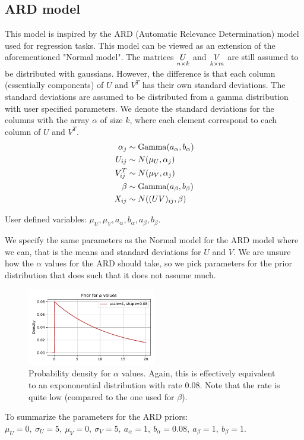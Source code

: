 \documentclass[12pt]{article}
\begin{document}
    \subsection{ARD model}
    This model is inspired by the ARD (Automatic Relevance Determination) model used for regression tasks. This model can be viewed as an extension of the aforementioned "Normal model". The matrices $\underset{n \times k}{U}$ and $\underset{k \times m}{V}$ are still assumed to be distributed with gaussians. However, the difference is that each column (essentially components) of $U$ and $V^T$ has their own standard deviations. The standard deviations are assumed to be distributed from a gamma distribution with user specified parameters. We denote the standard deviations for the columns with the array $\alpha$ of size $k$, where each element correspond to each column of $U$ and $V^T$.
    \begin{align*}
        \alpha_{j}  &\sim \operatorname{Gamma}(a_\alpha, b_\alpha) \\
        U_{ij}  &\sim N(\mu_U, \alpha_j) \\
        V^T_{ij}  &\sim N(\mu_V, \alpha_j) \\
        \beta  &\sim \operatorname{Gamma}(a_\beta, b_\beta) \\
        X_{ij} &\sim N((UV)_{ij}, \beta)
    \end{align*}

    User defined variables: $\mu_U, \mu_V, a_\alpha, b_\alpha, a_\beta, b_\beta$.
    
    \vspace{3mm}
    We specify the same parameters as the Normal model for the ARD model where we can, that is the means and standard deviations for $U$ and $V$. We are unsure how the $\alpha$ values for the ARD should take, so we pick parameters for the prior distribution that does such that it does not assume much. 
    \begin{figure}[H]
        \centering
        \includegraphics[width=0.5\textwidth]{alphaprior.pdf}
        \caption{Probability density for $\alpha$ values. Again, this is effectively equivalent to an expononential distribution with rate $0.08$. Note that the rate is quite low (compared to the one used for $\beta$).}
    \end{figure}
    To summarize the parameters for the ARD priors: $\mu_U=0,\ \sigma_U=5,\ \mu_V=0,\ \sigma_V=5,\ a_\alpha=1,\ b_\alpha=0.08, \ a_\beta=1,\ b_\beta=1$.
\end{document}
